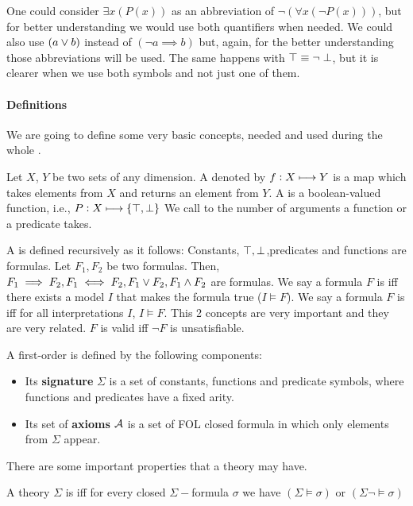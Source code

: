 One could consider $\exists x(P(x))$  as an abbreviation of $\neg (\forall x(\neg P(x)))$, but for better understanding we would use both quantifiers when needed.
We could also use $(a \vee b)$ instead of $(\neg a \implies b)$ but, again, for the better understanding those abbreviations will be used.
The same happens with $\top \equiv \neg \perp$, but it is clearer when we use both symbols and not just one of them.


\paragraph{Definitions}

We are going to define some very basic concepts, needed and used during the whole \thisworkmp.


Let $X$, $Y$ be two sets of any dimension.
%
A  denoted by $f : X\longmapsto Y$ is a map which takes elements from $X$ and returns an element from $Y$.
%
A  is a boolean-valued function, i.e., $P : X\longmapsto \{\top,\perp\}$
%
We call  to the number of arguments a function or a predicate takes.

A  is defined recursively as it follows: Constants, $\top,\perp$,predicates and functions are formulas. Let $F_1,F_2$ be two formulas. Then, $F_1\implies F_2, F_1\iff F_2, F_1\vee F_2, F_1\wedge F_2$ are formulas.
%
We say a formula $F$ is  \gls{iff} there exists a model $I$ that makes the formula true ($I \vDash F$). 
%
We say a formula $F$ is  \gls{iff} for all interpretations $I$, $I\vDash F$.
\label{def:validity}
This 2 concepts are very important and they are very related. $F$ is valid \gls{iff} $\neg F$ is unsatisfiable. 


A first-order  is defined by the following components: 
\begin{itemize}
	\item Its \textbf{signature} $\Sigma$ is a set of constants, functions and predicate symbols, where functions and predicates have a fixed arity.
	\item Its set of \textbf{axioms} $\mathcal{A}$ is a set of \gls{FOL} closed formula in which only elements from $\Sigma$ appear.
\end{itemize}


There are some important properties that a theory may have. 

A theory $\Sigma$ is  \gls{iff} for every closed $\Sigma-$formula $\sigma$ we have $(\Sigma\vDash \sigma) \text{ or } (\Sigma\neg\vDash \sigma) $

